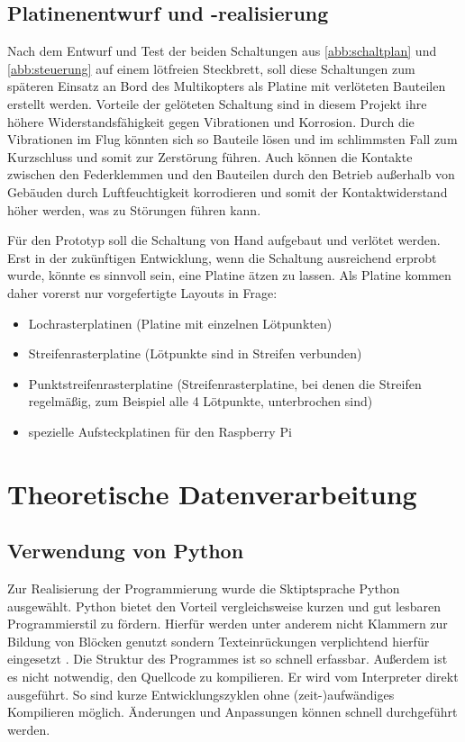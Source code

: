 \documentclass[a4paper,12pt,bibliography=totoc, listof=totoc,titlepage,pointlessnumbers]{scrreprt}
\begin{document}
\section{Platinenentwurf und -realisierung}
Nach dem Entwurf und Test der beiden Schaltungen aus \autoref{abb:schaltplan} und \autoref{abb:steuerung} auf einem lötfreien Steckbrett, soll diese Schaltungen zum späteren Einsatz an Bord des Multikopters als Platine mit verlöteten Bauteilen erstellt werden. Vorteile der gelöteten Schaltung sind in diesem Projekt ihre höhere Widerstandsfähigkeit gegen Vibrationen und Korrosion. Durch die Vibrationen im Flug könnten sich so Bauteile lösen und im schlimmsten Fall zum Kurzschluss und somit zur Zerstörung führen. Auch können die Kontakte zwischen den Federklemmen und den Bauteilen durch den Betrieb außerhalb von Gebäuden durch Luftfeuchtigkeit korrodieren und somit der Kontaktwiderstand höher werden, was zu Störungen führen kann.

Für den Prototyp soll die Schaltung von Hand aufgebaut und verlötet werden. Erst in der zukünftigen Entwicklung, wenn die Schaltung ausreichend erprobt wurde, könnte es sinnvoll sein, eine Platine ätzen zu lassen. Als Platine kommen daher vorerst nur vorgefertigte Layouts in Frage:

\begin{itemize}
 \item Lochrasterplatinen (Platine mit einzelnen Lötpunkten)
 \item Streifenrasterplatine (Lötpunkte sind in Streifen verbunden)
 \item Punktstreifenrasterplatine (Streifenrasterplatine, bei denen die Streifen regelmäßig, zum Beispiel alle 4 Lötpunkte, unterbrochen sind)
 \item spezielle Aufsteckplatinen für den Raspberry Pi
\end{itemize}



\chapter{Theoretische Datenverarbeitung}
\label{c:datenverarbeitung}

\section{Verwendung von Python}
Zur Realisierung der Programmierung wurde die Sktiptsprache Python ausgewählt. Python bietet den Vorteil vergleichsweise kurzen und gut lesbaren Programmierstil zu fördern. Hierfür werden unter anderem nicht Klammern zur Bildung von Blöcken genutzt sondern Texteinrückungen verplichtend hierfür eingesetzt \citep[S. 13f]{python}. Die Struktur des Programmes ist so schnell erfassbar. Außerdem ist es nicht notwendig, den Quellcode zu kompilieren. Er wird vom Interpreter direkt ausgeführt. So sind kurze Entwicklungszyklen ohne (zeit-)aufwändiges Kompilieren möglich. Änderungen und Anpassungen können schnell durchgeführt werden.
\end{document}
